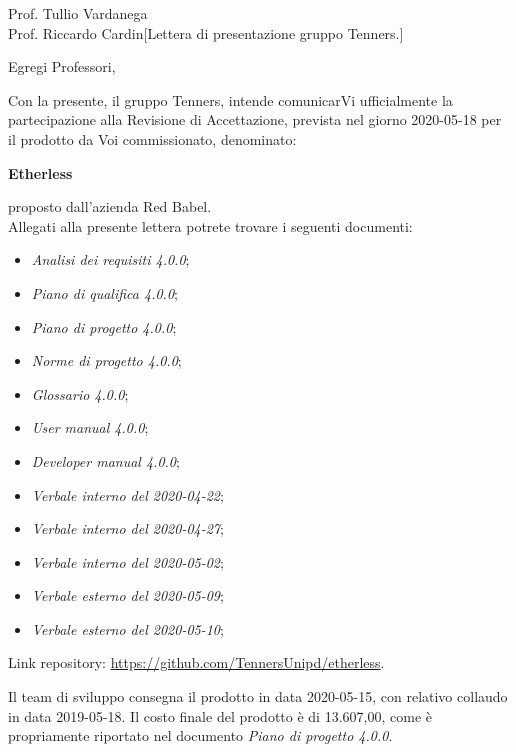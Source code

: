 \begin{letter}{Prof. Tullio Vardanega \\Prof. Riccardo Cardin}[Lettera di presentazione gruppo Tenners.]
\opening[Padova, ]{Egregi Professori,}
	Con la presente, il gruppo Tenners, intende comunicarVi ufficialmente la partecipazione alla Revisione di Accettazione, prevista nel giorno 2020-05-18 per il prodotto da Voi commissionato, denominato:
	\begin{center}
		\textbf{Etherless}
	\end{center}
    proposto dall'azienda Red Babel.\\
    \noindent Allegati alla presente lettera potrete trovare i seguenti documenti:
    \begin{itemize}
    	\item \textit{Analisi dei requisiti 4.0.0}\docs;
    	\item \textit{Piano di qualifica 4.0.0}\docs;
    	\item \textit{Piano di progetto 4.0.0}\docs;
    	\item \textit{Norme di progetto 4.0.0}\docs;
    	\item \textit{Glossario 4.0.0}\docs;
    	\item \textit{User manual 4.0.0}\docs;
    	\item \textit{Developer manual 4.0.0}\docs;
    	\item \textit{Verbale interno del 2020-04-22}\docs;
    	\item \textit{Verbale interno del 2020-04-27}\docs;
    	\item \textit{Verbale interno del 2020-05-02}\docs;
    	\item \textit{Verbale esterno del 2020-05-09}\docs;
    	\item \textit{Verbale esterno del 2020-05-10}\docs;
    	
    \end{itemize}
	Link repository: \url{https://github.com/TennersUnipd/etherless}.
	
	\noindent Il team di sviluppo consegna il prodotto in data 2020-05-15, con relativo collaudo in data 2019-05-18. Il costo finale del prodotto è di 13.607,00\officialeuro, come è propriamente riportato nel documento \textit{Piano di progetto 4.0.0}\docs.
	

\end{letter}
